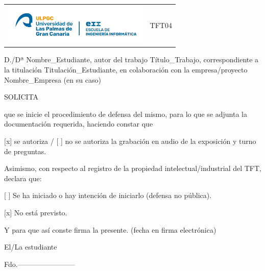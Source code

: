 
\thispagestyle{empty}

\begin{tabular}{p{15cm}p{5cm}}
  \includegraphics[width=7cm]{Ilustraciones/NuevoLogoEII.png}   &  TFT04\\
\end{tabular}

\vspace{1em}
\fboxrule=2pt
\begin{center}
\end{center}

\vspace{1em}
\justify
D./Dª Nombre\_Estudiante, autor del trabajo Título\_Trabajo, correspondiente a la titulación Titulación\_Estudiante, en colaboración con la empresa/proyecto Nombre\_Empresa (en su caso)

\vspace{1em}
SOLICITA

\vspace{1em}
que se inicie el procedimiento de defensa del mismo, para lo que se adjunta la documentación requerida, haciendo constar que 

[x] se autoriza / [ ] no se autoriza la grabación en audio de la exposición y turno de preguntas.

\vspace{1em}
Asimismo, con respecto al registro de la propiedad intelectual/industrial del TFT, declara que:

[ ] Se ha iniciado o hay intención de iniciarlo (defensa no pública).

[x] No está previsto.

\vspace{1em}
Y para que así conste firma la presente. (fecha en firma electrónica)

\begin{center}

\vspace{1em}
El/La estudiante

\vspace{3em}
Fdo.------------------------
\end{center}

